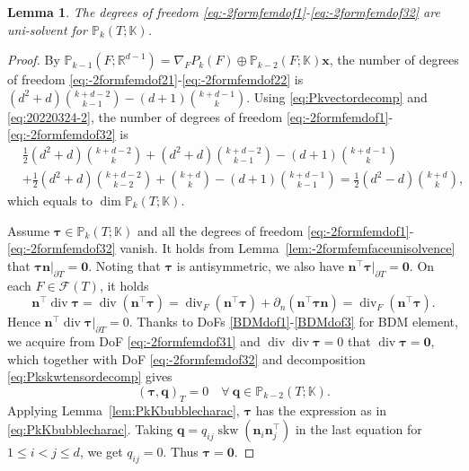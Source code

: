 \documentclass[10pt]{amsart}
\newtheorem{lemma}[theorem]{Lemma}
\renewcommand{\div}{\operatorname{div}}
\newcommand{\skw}{\operatorname{skw}}
\numberwithin{equation}{section}
\begin{document}
\begin{lemma}
The degrees of freedom \eqref{eq:-2formfemdof1}-\eqref{eq:-2formfemdof32} are uni-solvent for $\mathbb P_k(T;\mathbb K)$.
\end{lemma}
\begin{proof}
By $\mathbb P_{k-1}(F;\mathbb R^{d-1})=\nabla_FP_k(F)\oplus\mathbb P_{k-2}(F;\mathbb K)\boldsymbol{x}$,
the number of degrees of freedom \eqref{eq:-2formfemdof21}-\eqref{eq:-2formfemdof22} is
$
(d^2+d){k+d-2\choose k-1} - (d+1){k+d-1\choose k}.
$
Using \eqref{eq:Pkvectordecomp} and \eqref{eq:20220324-2},
the number of degrees of freedom \eqref{eq:-2formfemdof1}-\eqref{eq:-2formfemdof32} is
\begin{align*}
&\frac{1}{2}(d^2+d){k+d-2\choose k} + (d^2+d){k+d-2\choose k-1} - (d+1){k+d-1\choose k} \\
&+ \frac{1}{2}(d^2+d){k+d-2\choose k-2}+{k+d\choose k}-(d+1){k+d-1\choose k-1} =\frac{1}{2}(d^2-d){k+d\choose k},
\end{align*}
which equals to $\dim\mathbb P_k(T;\mathbb K)$.

Assume $\boldsymbol{\tau}\in\mathbb P_k(T;\mathbb K)$ and all the degrees of freedom \eqref{eq:-2formfemdof1}-\eqref{eq:-2formfemdof32} vanish. 
It holds from Lemma~\ref{lem:-2formfemfaceunisolvence} that $\boldsymbol{\tau}\boldsymbol{n}|_{\partial T}=\boldsymbol{0}$. Noting that $\boldsymbol{\tau}$ is antisymmetric,  we also have $\boldsymbol{n}^{\intercal}\boldsymbol{\tau}|_{\partial T}=\boldsymbol{0}$. On each $F\in\mathcal F(T)$, it holds
\begin{equation}\label{eq:20220324-3}
\boldsymbol{n}^{\intercal}\div\boldsymbol{\tau}=\div(\boldsymbol{n}^{\intercal}\boldsymbol{\tau})= \div_F(\boldsymbol{n}^{\intercal}\boldsymbol{\tau})+\partial_n(\boldsymbol{n}^{\intercal}\boldsymbol{\tau}\boldsymbol{n})=\div_F(\boldsymbol{n}^{\intercal}\boldsymbol{\tau}).
\end{equation}
Hence $\boldsymbol{n}^{\intercal}\div\boldsymbol{\tau}|_{\partial T}=0$. 
Thanks to DoFs \eqref{BDMdof1}-\eqref{BDMdof3} for BDM element, we acquire from DoF \eqref{eq:-2formfemdof31} and $\div\div\boldsymbol{\tau}=0$ that $\div\boldsymbol{\tau}=\boldsymbol{0}$, which together with DoF \eqref{eq:-2formfemdof32} and decomposition \eqref{eq:Pkskwtensordecomp} gives
$$
(\boldsymbol{\tau}, \boldsymbol{q})_T=0  \quad \forall~\boldsymbol{q}\in \mathbb P_{k-2}(T;\mathbb K).
$$
Applying Lemma~\ref{lem:PkKbubblecharac}, $\boldsymbol{\tau}$ has the expression as in \eqref{eq:PkKbubblecharac}. Taking $\boldsymbol{q}=q_{ij}\skw({\boldsymbol n_i\boldsymbol n_j^{\intercal}})$ in the last equation for $1\leq i<j\leq d$, we get $q_{ij}=0$. Thus $\boldsymbol{\tau}=\boldsymbol{0}$.
\end{proof}
\end{document}
